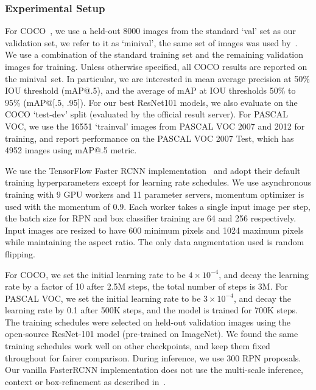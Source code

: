 \documentclass[10pt,twocolumn,letterpaper]{article}
\newcommand{\minival}{minival\raisebox{0.2ex}{$\ast$}}
\begin{document}
\subsubsection*{Experimental Setup}
For COCO~\cite{COCO}, we use a held-out 8000 images from the standard `val' set as our validation set, we refer to it as `\minival', the same set of images was used by~\cite{Google_FRCNN}. We use a combination of the standard training set and the remaining validation images for training. Unless otherwise specified, all COCO results are reported on the \minival\ set. In particular, we are interested in mean
average precision at 50\% IOU threshold (mAP@.5), and the average of mAP at IOU thresholds 50\% to 95\% (mAP@[.5, .95]). For our best ResNet101 models, we also evaluate on the COCO `test-dev' split (evaluated by the official result server). For PASCAL VOC, we use the 16551 `trainval' images from 
PASCAL VOC 2007 and 2012 for training, and report performance on the PASCAL VOC 2007 Test, which has 4952 images using mAP@.5 metric.


We use the TensorFlow Faster RCNN implementation~\cite{Google_FRCNN} and adopt their default training
hyperparameters except for learning rate schedules. We use asynchronous training with 9 GPU workers and 11 parameter servers, momentum optimizer is used with the momentum of 0.9. Each worker takes a single input image per step, the batch size for RPN and box classifier training
are 64 and 256 respectively. Input images are resized to have 600 minimum pixels and 1024 maximum pixels while maintaining the aspect ratio. The only data augmentation used is random flipping.

For COCO, we set the initial learning rate to be
$4\times 10^{-4}$, and decay the learning rate by a factor of 10 after 2.5M steps, the total number of steps is 3M.
For PASCAL VOC, we set the initial learning rate to be $3\times 10^{-4}$, and decay the learning rate by 0.1 after 500K steps, and the model is trained for 700K steps. The training schedules were selected on held-out validation images using the open-source ResNet-101 model (pre-trained on ImageNet). We found the same training schedules work well on other checkpoints, and keep them fixed throughout for fairer comparison. During inference, we use 300 RPN proposals. Our vanilla FasterRCNN implementation does not use the multi-scale inference, context or box-refinement as described in~\cite{FasterRCNN}.
\end{document}
